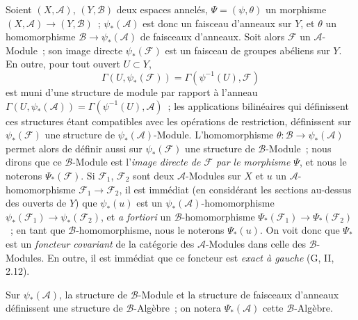 \begin{env}[4.2.1]
\label{0.4.2.1-fr}
Soient $(X,\mathcal{A})$, $(Y,\mathcal{B})$ deux espaces annelés,
$\Psi=(\psi,\theta)$ un morphisme
$(X,\mathcal{A})\to(Y,\mathcal{B})$~; $\psi_*(\mathcal{A})$ est donc un
faisceau d'anneaux sur $Y$, et $\theta$ un homomorphisme
$\mathcal{B}\to\psi_*(\mathcal{A})$ de faisceaux d'anneaux. Soit alors
$\mathcal{F}$ un $\mathcal{A}$-Module~; son image directe
$\psi_*(\mathcal{F})$ est un faisceau de groupes abéliens sur $Y$. En outre,
pour tout ouvert $U\subset Y$,
\[
  \Gamma(U,\psi_*(\mathcal{F}))
  =\Gamma(\psi^{-1}(U),\mathcal{F})
\]
est muni d'une structure de module par rapport à l'anneau
$\Gamma(U,\psi_*(\mathcal{A}))=\Gamma(\psi^{-1}(U),\mathcal{A})$~; les
applications bilinéaires qui définissent ces structures étant compatibles
avec les opérations de restriction, définissent sur $\psi_*(\mathcal{F})$ une
structure de $\psi_*(\mathcal{A})$-Module. L'homomorphisme
$\theta:\mathcal{B}\to\psi_*(\mathcal{A})$ permet alors de définir aussi sur
$\psi_*(\mathcal{F})$ une structure de $\mathcal{B}$-Module~; nous dirons que
ce $\mathcal{B}$-Module est l'\emph{image directe de $\mathcal{F}$ par le
morphisme $\Psi$}, et nous le noterons $\Psi_*(\mathcal{F})$. Si
$\mathcal{F}_1$, $\mathcal{F}_2$ sont deux $\mathcal{A}$-Modules sur $X$ et
$u$ un $\mathcal{A}$-homomorphisme $\mathcal{F}_1\to\mathcal{F}_2$, il est
immédiat (en considérant les sections au-dessus des ouverts de $Y$) que
$\psi_*(u)$ est un $\psi_*(\mathcal{A})$-homomorphisme
$\psi_*(\mathcal{F}_1)\to\psi_*(\mathcal{F}_2)$, et \emph{a fortiori} un
$\mathcal{B}$-homomorphisme
$\Psi_*(\mathcal{F}_1)\to\Psi_*(\mathcal{F}_2)$~; en tant que
$\mathcal{B}$-homomorphisme, nous le noterons $\Psi_*(u)$. On voit donc que
$\Psi_*$ est un \emph{foncteur covariant} de la catégorie des
$\mathcal{A}$-Modules dans celle des $\mathcal{B}$-Modules. En outre, il est
immédiat que ce foncteur est \emph{exact à gauche} (G, II, 2.12).

Sur $\psi_*(\mathcal{A})$, la structure de $\mathcal{B}$-Module et la
structure de faisceaux d'anneaux définissent une structure de
$\mathcal{B}$-Algèbre~; on notera $\Psi_*(\mathcal{A})$ cette
$\mathcal{B}$-Algèbre.
\end{env}

